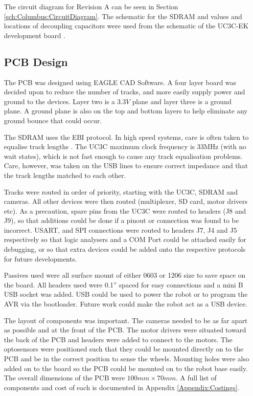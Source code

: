 \begin{table}
\begin{tabular}{ccccc}
\end{tabular}
\end{table}

The circuit diagram for Revision A can be seen in Section \ref{sch:Columbus:CircuitDiagram}. The schematic for the SDRAM and values and locations of decoupling capacitors were used from the schematic of the UC3C-EK development board \citep{Atmel:UC3CEK}. 
\subsection{PCB Design}
The PCB was designed using EAGLE CAD Software. A four layer board was decided upon to reduce the number of tracks, and more easily supply power and ground to the devices. Layer two is a $3.3V$ plane and layer three is a ground plane. A ground plane is also on the top and bottom layers to help eliminate any ground bounce that could occur. 

The SDRAM uses the EBI protocol. In high speed systems, care is often taken to equalise track lengths \citep{liu2004equalization}. The UC3C maximum clock frequency is 33MHz (with no wait states), which is not fast enough to cause any track equalisation problems. Care, however, was taken on the USB lines to ensure correct impedance and that the track lengths matched to each other.

Tracks were routed in order of priority, starting with the UC3C, SDRAM and cameras. All other devices were then routed (\itc multiplexer, SD card, motor drivers etc). As a precaution, spare pins from the UC3C were routed to headers (J8 and J9), so that additions could be done if a pinout or connection was found to be incorrect. USART, \itc and SPI connections were routed to headers J7, J4 and J5 respectively so that logic analysers and a COM Port could be attached easily for debugging, or so that extra devices could be added onto the respective protocols for future developments. 

Passives used were all surface mount of either 0603 or 1206 size to save space on the board. All headers used were 0.1'' spaced for easy connections and a mini B USB socket was added. USB could be used to power the robot or to program the AVR via the bootloader. Future work could make the robot act as a USB device. 

The layout of components was important. The cameras needed to be as far apart as possible and at the front of the PCB. The motor drivers were situated toward the back of the PCB and headers were added to connect to the motors. The optosensors were positioned such that they could be mounted directly on to the PCB and be in the correct position to sense the wheels. Mounting holes were also added on to the board so the PCB could be mounted on to the robot base easily. The overall dimensions of the PCB were $100mm \times 70mm$. A full list of components and cost of each is documented in Appendix \ref{Appendix:Costings}.

